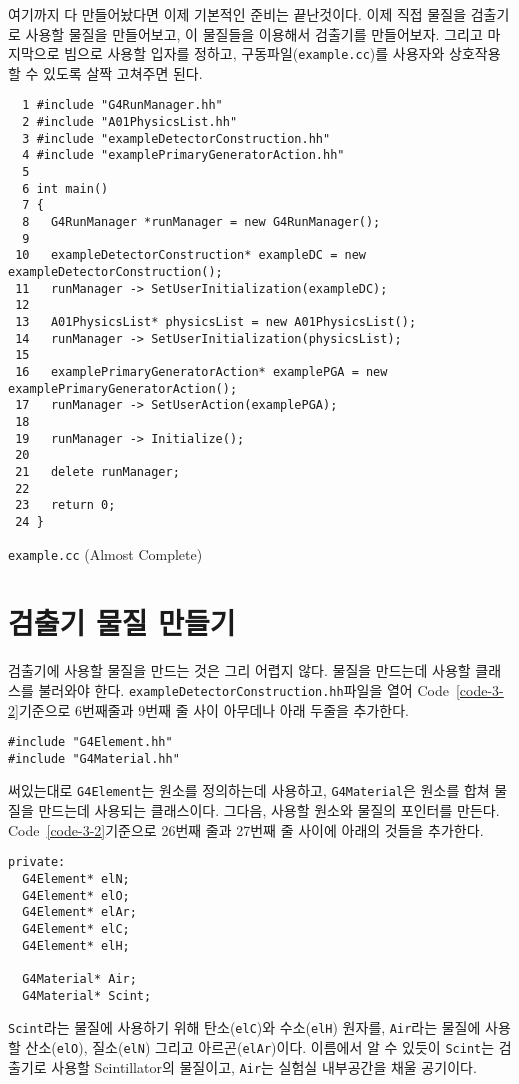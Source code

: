 여기까지 다 만들어놨다면 이제 기본적인 준비는 끝난것이다. 이제 직접 물질을
검출기로 사용할 물질을 만들어보고, 이 물질들을 이용해서 검출기를 만들어보자.
그리고 마지막으로 빔으로 사용할 입자를 정하고, 구동파일(\texttt{example.cc})를
사용자와 상호작용 할 수 있도록 살짝 고쳐주면 된다.

\begin{code}[p]
\begin{lstlisting}
  1 #include "G4RunManager.hh"
  2 #include "A01PhysicsList.hh"
  3 #include "exampleDetectorConstruction.hh"
  4 #include "examplePrimaryGeneratorAction.hh"
  5 
  6 int main()
  7 {
  8   G4RunManager *runManager = new G4RunManager();
  9 
 10   exampleDetectorConstruction* exampleDC = new exampleDetectorConstruction();
 11   runManager -> SetUserInitialization(exampleDC);
 12 
 13   A01PhysicsList* physicsList = new A01PhysicsList();
 14   runManager -> SetUserInitialization(physicsList);
 15 
 16   examplePrimaryGeneratorAction* examplePGA = new examplePrimaryGeneratorAction();
 17   runManager -> SetUserAction(examplePGA);
 18 
 19   runManager -> Initialize();
 20 
 21   delete runManager;
 22 
 23   return 0;
 24 }
\end{lstlisting}
\caption{\texttt{example.cc} (Almost Complete) \label{code-3-6}}
\end{code}

\section{검출기 물질 만들기}

검출기에 사용할 물질을 만드는 것은 그리 어렵지 않다. 물질을 만드는데 사용할
클래스를 불러와야 한다. \texttt{exampleDetectorConstruction.hh}파일을 열어
Code~\ref{code-3-2}기준으로 6번째줄과 9번째 줄 사이 아무데나 아래 두줄을 추가한다.
\begin{pc}
\begin{lstlisting}
#include "G4Element.hh"
#include "G4Material.hh"
\end{lstlisting}
\end{pc}
써있는대로 \texttt{G4Element}는 원소를 정의하는데 사용하고,
\texttt{G4Material}은 원소를 합쳐 물질을 만드는데 사용되는 클래스이다.
그다음, 사용할 원소와 물질의 포인터를 만든다. Code~\ref{code-3-2}기준으로
26번째 줄과 27번째 줄 사이에 아래의 것들을 추가한다.
\begin{pc}
\begin{lstlisting}
private:
  G4Element* elN;
  G4Element* elO;
  G4Element* elAr;
  G4Element* elC;
  G4Element* elH;

  G4Material* Air;
  G4Material* Scint;
\end{lstlisting}
\end{pc}
\texttt{Scint}라는 물질에 사용하기 위해 탄소(\texttt{elC})와 수소(\texttt{elH})
원자를, \texttt{Air}라는 물질에 사용할 산소(\texttt{elO}), 질소(\texttt{elN})
그리고 아르곤(\texttt{elAr})이다. 이름에서 알 수 있듯이 \texttt{Scint}는
검출기로 사용할 Scintillator의 물질이고, \texttt{Air}는 실험실 내부공간을 채울
공기이다.

